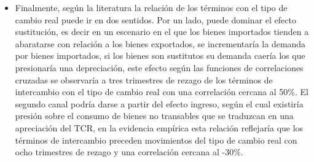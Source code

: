\documentclass[12pt,letterpaper]{article}
\begin{document}
\begin{itemize}
\item Finalmente, según la literatura la relación de los términos con el tipo de cambio real puede ir en dos sentidos. Por un lado, puede dominar el efecto sustitución, es decir en un escenario en el que los bienes importados tienden a abaratarse con relación a los bienes exportados, se incrementaría la demanda por bienes importados, si los bienes son sustitutos su demanda caería los que presionaría una depreciación, este efecto según las funciones de correlaciones cruzadas se observaría a tres trimestres de rezago de los términos de intercambio con el tipo de cambio real con una correlación cercana al 50\%. El segundo canal podría darse a partir del efecto ingreso, según el cual existiría presión sobre el consumo de bienes no transables que se traduzcan en una apreciación del TCR, en la evidencia empírica esta relación reflejaría que los términos de intercambio preceden movimientos del tipo de cambio real con ocho trimestres de rezago y una correlación cercana al -30\%.
\end{itemize}
\end{document}
